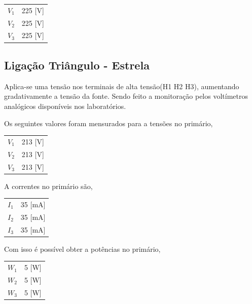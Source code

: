 \documentclass[paper=a4, fontsize=11pt]{article}
\begin{document}
\begin{center}
    \begin{tabular}{c||c}
        $V_1$ & 225 [V] \\
        $V_2$ & 225 [V] \\
        $V_3$ & 225 [V] \\
    \end{tabular}
\end{center}


\subsection{Ligação Triângulo - Estrela}

Aplica-se uma tensão nos terminais de alta tensão(H1 H2 H3), aumentando gradativamente
a tensão da fonte. Sendo feito a monitoração pelos voltímetros analógicos disponíveis
nos laboratórios.  


Os seguintes valores foram mensurados para a tensões no primário,

\begin{center}
    \begin{tabular}{c||c}
        $V_1$ & 213 [V] \\
        $V_2$ & 213 [V] \\
        $V_3$ & 213 [V] \\
    \end{tabular}
\end{center}

A correntes no primário são,

\begin{center}
    \begin{tabular}{c||c}
        $I_1$ & 35 [mA] \\
        $I_2$ & 35 [mA] \\
        $I_3$ & 35 [mA] \\
    \end{tabular}
\end{center}

Com isso é possível obter a potências no primário,

\begin{center}
    \begin{tabular}{c||c}
        $W_1$ & 5 [W] \\
        $W_2$ & 5 [W] \\
        $W_3$ & 5 [W] \\
    \end{tabular}
\end{center}
\end{document}

